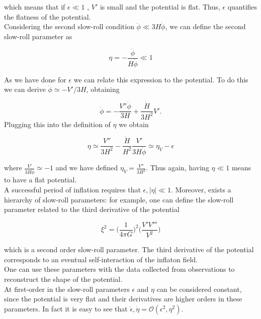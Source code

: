 \documentclass[11pt,a4paper,twoside]{book}
\begin{document}
which means that if $\epsilon \ll 1 $ , $V'$ is small and the potential is flat. Thus, $\epsilon$ quantifies the flatness of the potential.\\

Considering the second slow-roll condition $ \ddot{\phi} \ll 3H\dot{\phi} $, we can define the second slow-roll parameter as 

\begin{equation}
	\label{etaParameter}
	\eta = - \frac{\ddot{\phi}}{H\dot{\phi}} \ll 1
\end{equation}

As we have done for $\epsilon$ we can relate this expression to the potential. To do this we can derive $ \dot{\phi} \simeq -V'/3H $, obtaining

\begin{equation}
	\label{phiDerivedEtaParameter}
	\ddot{\phi} = -\frac{V'' \dot{\phi}}{3H} + \frac{\dot{H}}{3H^{2}}V'.
\end{equation}
Plugging this into the definition of $\eta$ we obtain

\begin{equation}
	\label{eta2}
	\eta \simeq \frac{V''}{3H^{2}} - \frac{\dot{H}}{H^{2}}\frac{V'}{3H\dot{\phi}} \simeq \eta_{V} - \epsilon
\end{equation}

where $ \frac{V'}{3H\dot{\phi}} \simeq -1 $ and we have defined $ \eta_{V}=\frac{V''}{3H^{2}} $. Thus again, having $\eta \ll 1$ means to have a flat potential.\\

A successful period of inflation requires that $ \epsilon, |\eta| \ll 1 $. Moreover, exists a hierarchy of slow-roll parameters: for example, one can define the slow-roll parameter related to the third derivative of the potential

\begin{equation}
	\label{secondOrderParameter}
	\xi^{2} = \Big (\frac{1}{4\pi G} \Big )^{2} \Big (\frac{V'V'''}{V^{2}}\Big )
\end{equation}

which is a second order slow-roll parameter. The third derivative of the potential corresponds to an eventual self-interaction of the inflaton field. \\
One can use these parameters with the data collected from observations to reconstruct the shape of the potential.\\
At first-order in the slow-roll parameters $\epsilon$ and $\eta$ can be considered constant, since the potential is very flat and their derivatives are higher orders in these parameters. In fact it is easy to see that $ \dot{\epsilon},\dot{\eta} = \mathcal{O}(\epsilon^{2},\eta^{2}) $.\\
\end{document}
